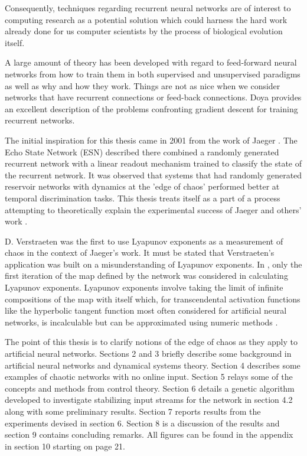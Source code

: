 \documentclass[12pt]{article}
\begin{document}
Consequently, techniques regarding recurrent neural networks
are of interest to computing research as a potential solution which could
harness the hard work already done for us computer scientists by the process
of biological evolution itself.

A large amount of theory has been developed with regard to feed-forward
neural networks from how to train them in both supervised and unsupervised
paradigms as well as why and how they work.  Things are not as nice when
we consider networks that have recurrent connections or feed-back connections.
Doya \cite{doya} 
provides an excellent description of the problems confronting gradient
descent for training recurrent networks.

The initial inspiration for this thesis came in 2001 from the work of
Jaeger \cite{jaeger_original}.
The Echo State Network (ESN) described there combined
a randomly generated recurrent network with a linear readout mechanism trained
to classify the state of the recurrent network.  It was observed that systems
that had randomly generated reservoir networks with dynamics at the 'edge of
chaos' performed better at temporal discrimination tasks.  This
thesis treats itself as a part of a process attempting to theoretically
explain the experimental success of Jaeger and others' work
\cite{maass_original}.

D. Verstraeten \cite{verstraeten} was the first
to use Lyapunov exponents as a measurement of chaos in the context of Jaeger's
work.  It must be stated that Verstraeten's application was built on a
misunderstanding of Lyapunov exponents.  In \cite{verstraeten},
only the first iteration
of the map defined by the network was considered in calculating Lyapunov
exponents.  Lyapunov exponents involve taking the limit of infinite
compositions of the map with itself which, for transcendental activation
functions like the hyperbolic tangent function most often considered for
artificial neural networks, is incalculable but can be approximated using
numeric methods \cite{sprott}.

The point of this thesis is to clarify notions of the edge of chaos
as they apply to artificial neural networks.  Sections 2 and 3 briefly describe
some background in artificial neural networks and dynamical systems theory.
Section 4 describes some examples of chaotic networks with no online input.
Section 5 relays some of the concepts and methods from control theory.
Section 6 details a genetic algorithm developed to investigate stabilizing
input streams for the network in section 4.2 along with some preliminary
results.  Section 7 reports results from the experiments devised in section 6.
Section 8 is a discussion of the results and section 9 contains concluding remarks.  All figures can be found in the appendix in section 10 starting on page 21.
\end{document}
